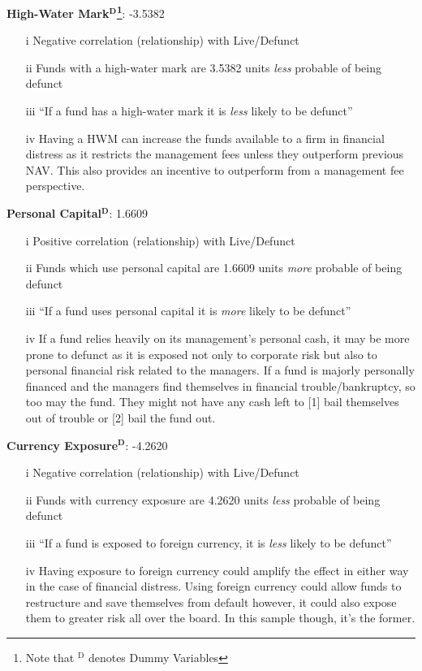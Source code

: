 \documentclass[11pt, english]{article}
\begin{document}
	\textbf{High-Water Mark$\mathbf{^D}$\footnote{Note that $\mathrm{^D}$ denotes Dummy Variables}}: -3.5382

        \begin{itemize}
        \setlength\itemsep{0cm}
                \item[i] Negative correlation (relationship) with Live/Defunct
		\item[ii] Funds with a high-water mark are 3.5382 units \textit{less} probable of being defunct
		\item[iii] ``If a fund has a high-water mark it is \textit{less} likely to be defunct''
                \item[iv] Having a HWM can increase the funds available to a firm in financial distress as it restricts the management fees unless they outperform previous NAV. This also provides an incentive to outperform from a management fee perspective.
        \end{itemize}

	\textbf{Personal Capital$\mathbf{^D}$}: 1.6609

        \begin{itemize}
        \setlength\itemsep{0cm}
                \item[i] Positive correlation (relationship) with Live/Defunct
		\item[ii] Funds which use personal capital are 1.6609 units \textit{more} probable of being defunct
		\item[iii] ``If a fund uses personal capital it is \textit{more} likely to be defunct''
                \item[iv] If a fund relies heavily on its management's personal cash, it may be more prone to defunct as it is exposed not only to corporate risk but also to personal financial risk related to the managers. If a fund is majorly personally financed and the managers find themselves in financial trouble/bankruptcy, so too may the fund. They might not have any cash left to [1] bail themselves out of trouble or [2] bail the fund out.
        \end{itemize}

	\textbf{Currency Exposure$\mathbf{^D}$}: -4.2620

        \begin{itemize}
        \setlength\itemsep{0cm}
                \item[i] Negative correlation (relationship) with Live/Defunct
		\item[ii] Funds with currency exposure are 4.2620 units \textit{less} probable of being defunct
                \item[iii] ``If a fund is exposed to foreign currency, it is \textit{less} likely to be defunct''
                \item[iv] Having exposure to foreign currency could amplify the effect in either way in the case of financial distress. Using foreign currency could allow funds to restructure and save themselves from default however, it could also expose them to greater risk all over the board. In this sample though, it's the former.
        \end{itemize}
\end{document}
